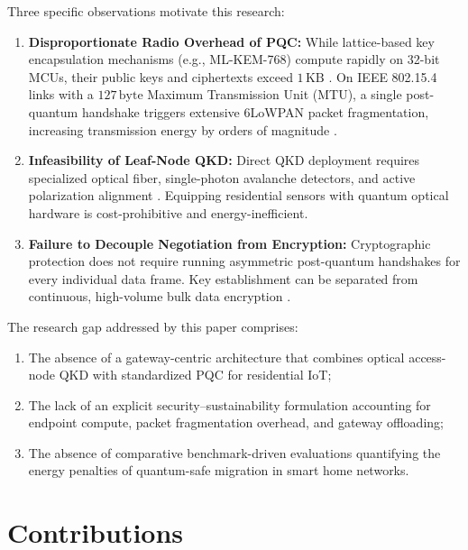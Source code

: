 \documentclass[journal]{IEEEtran}
\begin{document}
Three specific observations motivate this research:
\begin{enumerate}
    \item \textbf{Disproportionate Radio Overhead of PQC:} While lattice-based key
    encapsulation mechanisms (e.g., ML-KEM-768) compute rapidly on 32-bit MCUs, their public
    keys and ciphertexts exceed $1\,\text{KB}$ \cite{kannwischer2020pqm4}. On IEEE 802.15.4
    links with a $127\,\text{byte}$ Maximum Transmission Unit (MTU), a single post-quantum
    handshake triggers extensive 6LoWPAN packet fragmentation, increasing transmission energy
    by orders of magnitude \cite{montenegro2007transmission}.
    \item \textbf{Infeasibility of Leaf-Node QKD:} Direct QKD deployment requires specialized
    optical fiber, single-photon avalanche detectors, and active polarization alignment
    \cite{scarani,diamanti2016practical}. Equipping residential sensors with quantum optical
    hardware is cost-prohibitive and energy-inefficient.
    \item \textbf{Failure to Decouple Negotiation from Encryption:} Cryptographic protection
    does not require running asymmetric post-quantum handshakes for every individual data frame.
    Key establishment can be separated from continuous, high-volume bulk data encryption
    \cite{barker2020recommendation}.
\end{enumerate}

The research gap addressed by this paper comprises:
\begin{enumerate}[label=(\roman*)]
    \item The absence of a gateway-centric architecture that combines optical access-node
    QKD with standardized PQC for residential IoT;
    \item The lack of an explicit security--sustainability formulation accounting for
    endpoint compute, packet fragmentation overhead, and gateway offloading;
    \item The absence of comparative benchmark-driven evaluations quantifying the energy
    penalties of quantum-safe migration in smart home networks.
\end{enumerate}


\section{Contributions}
\end{document}
